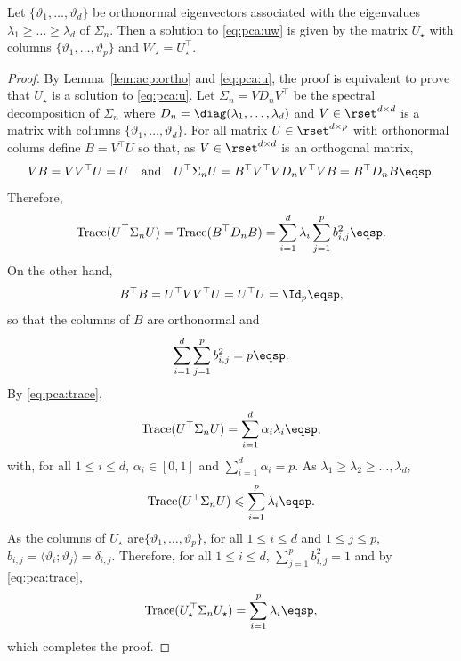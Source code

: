 \begin{shaded}
\begin{proposition} 
\label{prop:acp:svd}
Let $\{\vartheta_1,\ldots,\vartheta_d\}$ be orthonormal eigenvectors associated with the eigenvalues $\lambda_1\geqslant \ldots \geqslant \lambda_d$ of $\Sigma_n$. Then a solution to \eqref{eq:pca:uw} is given by the matrix $U_{\star}$ with columns $\{\vartheta_1,\ldots,\vartheta_p\}$ and $W_{\star} = U^\top_{\star}$.
\end{proposition}
\end{shaded}
\begin{proof}
By Lemma~\ref{lem:acp:ortho} and \eqref{eq:pca:u}, the proof is equivalent to prove that $U_{\star}$ is a solution to \eqref{eq:pca:u}. Let $\Sigma_n = VD_nV^\top$ be the spectral decomposition of $\Sigma_n$ where $D_n = \diag(\lambda_1,\ldots,\lambda_d)$ and $V\in\rset^{d\times d}$  is a matrix with columns $\{\vartheta_1,\ldots,\vartheta_d\}$. For all  matrix $U\in\rset^{d\times p}$  with orthonormal colums define $B = V^\top U$ so that, as $V\in\rset^{d\times d}$ is an orthogonal matrix,  
\[
VB = VV^\top U = U\quad\mathrm{and}\quad U^\top\Sigma_n U = B^\top V^\top VD_nV^\top VB = B^\top D_nB\eqsp.
\] 
Therefore,
\begin{equation}
\label{eq:pca:trace}
\mathrm{Trace}(U^\top\Sigma_n U) = \mathrm{Trace}(B^\top D_nB) = \sum_{i = 1}^d \lambda_i \sum_{j=1}^p b^2_{i,j}\eqsp.
\end{equation}
On the other hand,
\[
B^\top B = U^\top VV^\top U = U^\top U = \Id_p\eqsp,
\]
so that the columns of $B$ are orthonormal and
\[
\sum_{i = 1}^d \sum_{j=1}^p b^2_{i,j} = p\eqsp.
\]
%
%
By \eqref{eq:pca:trace},
\[
\mathrm{Trace}(U^\top\Sigma_n U) = \sum_{i=1}^{d}\alpha_i\lambda_i\eqsp,
\]
with, for all $1\leqslant i\leqslant d$, $\alpha_i \in[0,1]$ and $\sum_{i=1}^d\alpha_i  = p$. As $\lambda_1 \geqslant \lambda_2\geqslant \ldots, \lambda_d$\eqsp,
\[
\mathrm{Trace}(U^\top\Sigma_n U) \leqslant \sum_{i=1}^{p}\lambda_i\eqsp.
\]
As the columns of $U_{\star}$ are$\{\vartheta_1,\ldots,\vartheta_p\}$, for all $1\leqslant i\leqslant d$ and $1\leqslant j \leqslant p$, $b_{i,j} = \langle \vartheta_i;\vartheta_j\rangle = \delta_{i,j}$. Therefore,  for all $1\leqslant i\leqslant d$, $\sum_{j=1}^p b^2_{i,j} = 1$ and by \eqref{eq:pca:trace},
\[
\mathrm{Trace}(U_{\star}^\top\Sigma_n U_{\star}) =\sum_{i = 1}^p \lambda_i\eqsp,
\]
which completes the proof.
\end{proof}

